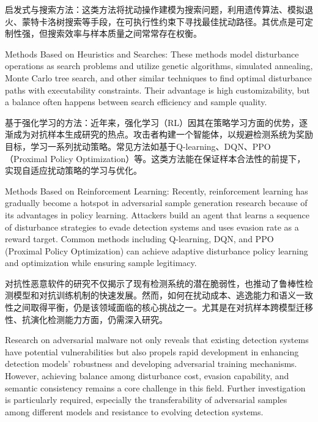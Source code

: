 启发式与搜索方法：这类方法将扰动操作建模为搜索问题，利用遗传算法\cite{wang2022black}、模拟退火\cite{bertsimas1993simulated}、蒙特卡洛树搜索\cite{chaslot2010monte}等手段，在可执行性约束下寻找最佳扰动路径。其优点是可定制性强，但搜索效率与样本质量之间常常存在权衡。

Methods Based on Heuristics and Searches: These methods model disturbance operations as search problems and utilize genetic algorithms\cite{wang2022black}, simulated annealing\cite{bertsimas1993simulated}, Monte Carlo tree search\cite{chaslot2010monte}, and other similar techniques to find optimal disturbance paths with executability constraints. Their advantage is high customizability, but a balance often happens between search efficiency and sample quality.

基于强化学习的方法：近年来，强化学习（RL）因其在策略学习方面的优势，逐渐成为对抗样本生成研究的热点。攻击者构建一个智能体，以规避检测系统为奖励目标，学习一系列扰动策略。常见方法如基于Q-learning\cite{watkins1992q}、DQN\cite{osband2016deep}、PPO\cite{yu2022surprising}（Proximal Policy Optimization）等。这类方法能在保证样本合法性的前提下，实现自适应扰动策略的学习与优化。

Methods Based on Reinforcement Learning: Recently, reinforcement learning has gradually become a hotspot in adversarial sample generation research because of its advantages in policy learning. Attackers build an agent that learns a sequence of disturbance strategies to evade detection systems and uses evasion rate as a reward target. Common methods including Q-learning\cite{watkins1992q}, DQN\cite{osband2016deep}, and PPO \cite{yu2022surprising}(Proximal Policy Optimization) can achieve adaptive disturbance policy learning and optimization while ensuring sample legitimacy.

对抗性恶意软件的研究不仅揭示了现有检测系统的潜在脆弱性，也推动了鲁棒性检测模型和对抗训练机制的快速发展。然而，如何在扰动成本、逃逸能力和语义一致性之间取得平衡，仍是该领域面临的核心挑战之一。尤其是在对抗样本跨模型迁移性、抗演化检测能力方面，仍需深入研究。

Research on adversarial malware not only reveals that existing detection systems have potential vulnerabilities but also propels rapid development in enhancing detection models’ robustness and developing adversarial training mechanisms. However, achieving balance among disturbance cost, evasion capability, and semantic consistency remains a core challenge in this field. Further investigation is particularly required, especially the transferability of adversarial samples among different models and resistance to evolving detection systems.  


